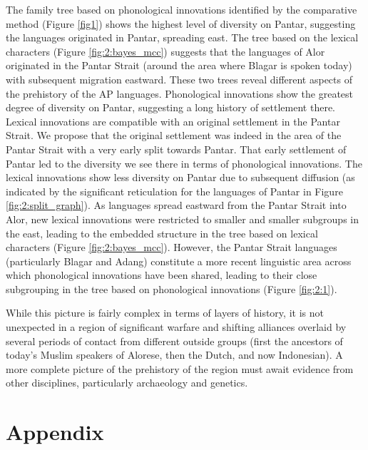The family tree based on phonological innovations identified by the comparative method (Figure \ref{fig1}) shows the highest level of diversity on Pantar, suggesting the languages originated in Pantar, spreading east. The tree based on the lexical characters (Figure \ref{fig:2:bayes_mcc}) suggests that the languages of Alor originated in the Pantar Strait (around the area where Blagar is spoken today) with subsequent migration eastward. These two trees reveal different aspects of the prehistory of the AP languages. Phonological innovations show the greatest degree of diversity on Pantar, suggesting a long history of settlement there. Lexical innovations are compatible with an original settlement in the Pantar Strait. We propose that the original settlement was indeed in the area of the Pantar Strait with a very early split towards Pantar. That early settlement of Pantar led to the diversity we see there in terms of phonological innovations. The lexical innovations show less diversity on Pantar due to subsequent diffusion (as indicated by 
the significant reticulation for the languages of Pantar in Figure \ref{fig:2:split_graph}). As languages spread eastward from the Pantar Strait into Alor, new lexical innovations were restricted to smaller and smaller subgroups in the east, leading to the embedded structure in the tree based on lexical characters (Figure \ref{fig:2:bayes_mcc}). However, the Pantar Strait languages (particularly Blagar and Adang) constitute a more recent linguistic area across which phonological innovations have been shared, leading to their close subgrouping in the tree based on phonological innovations (Figure \ref{fig:2:1}).  

While this picture is fairly complex in terms of layers of history, it is not unexpected in a region of significant warfare and shifting alliances overlaid by several periods of contact from different outside groups (first the ancestors of today's Muslim speakers of Alorese, then the Dutch, and now Indonesian). A more complete picture of the prehistory of the region must await evidence from other disciplines, particularly archaeology and genetics. 

\section*{Appendix}

